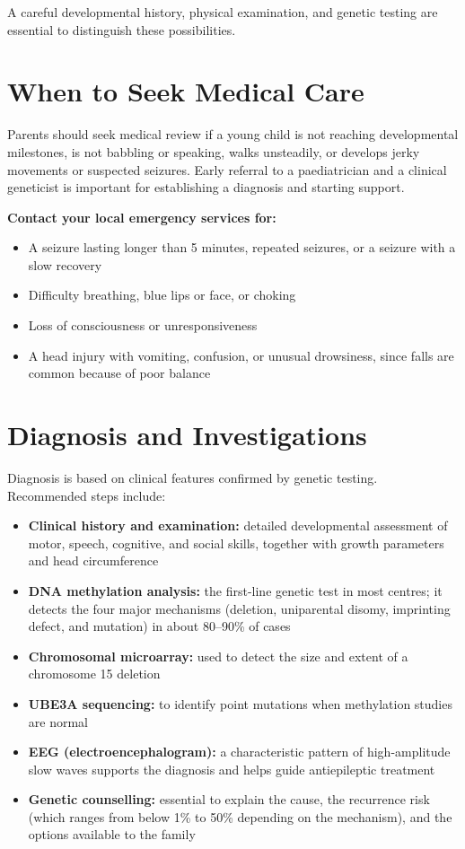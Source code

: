 A careful developmental history, physical examination, and genetic testing are essential to distinguish these possibilities.

\section*{When to Seek Medical Care}
Parents should seek medical review if a young child is not reaching developmental milestones, is not babbling or speaking, walks unsteadily, or develops jerky movements or suspected seizures. Early referral to a paediatrician and a clinical geneticist is important for establishing a diagnosis and starting support.

\textbf{Contact your local emergency services for:}
\begin{itemize}
    \item A seizure lasting longer than 5 minutes, repeated seizures, or a seizure with a slow recovery
    \item Difficulty breathing, blue lips or face, or choking
    \item Loss of consciousness or unresponsiveness
    \item A head injury with vomiting, confusion, or unusual drowsiness, since falls are common because of poor balance
\end{itemize}

\section*{Diagnosis and Investigations}
Diagnosis is based on clinical features confirmed by genetic testing. Recommended steps include:

\begin{itemize}
    \item \textbf{Clinical history and examination:} detailed developmental assessment of motor, speech, cognitive, and social skills, together with growth parameters and head circumference
    \item \textbf{DNA methylation analysis:} the first-line genetic test in most centres; it detects the four major mechanisms (deletion, uniparental disomy, imprinting defect, and mutation) in about 80--90\% of cases
    \item \textbf{Chromosomal microarray:} used to detect the size and extent of a chromosome 15 deletion
    \item \textbf{UBE3A sequencing:} to identify point mutations when methylation studies are normal
    \item \textbf{EEG (electroencephalogram):} a characteristic pattern of high-amplitude slow waves supports the diagnosis and helps guide antiepileptic treatment
    \item \textbf{Genetic counselling:} essential to explain the cause, the recurrence risk (which ranges from below 1\% to 50\% depending on the mechanism), and the options available to the family
\end{itemize}


